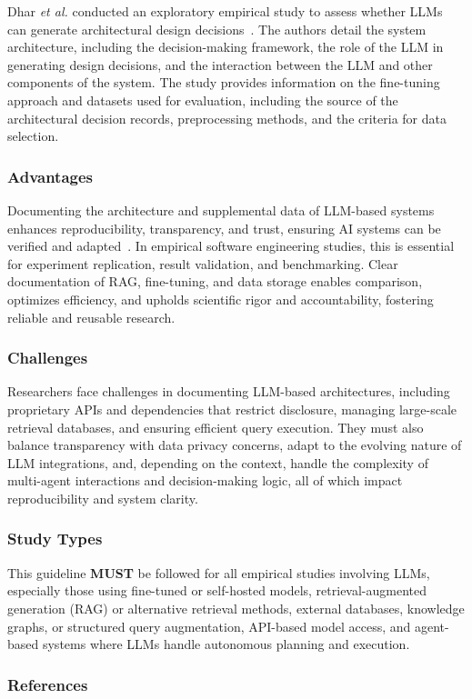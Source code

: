 \documentclass[11pt]{article}
\newcommand{\must}{\textbf{MUST}\xspace}
\begin{document}
Dhar \textit{et al.} conducted an exploratory empirical study to assess whether LLMs can generate architectural design decisions~\cite{DBLP:conf/icsa/DharVV24}. The authors detail the system architecture, including the decision-making framework, the role of the LLM in generating design decisions, and the interaction between the LLM and other components of the system. The study provides information on the fine-tuning approach and datasets used for evaluation, including the source of the architectural decision records, preprocessing methods, and the criteria for data selection. 

\subsubsection{Advantages}

Documenting the architecture and supplemental data of LLM-based systems enhances reproducibility, transparency, and trust, ensuring AI systems can be verified and adapted~\cite{DBLP:journals/software/LuZXXW24}. In empirical software engineering studies, this is essential for experiment replication, result validation, and benchmarking. Clear documentation of RAG, fine-tuning, and data storage enables comparison, optimizes efficiency, and upholds scientific rigor and accountability, fostering reliable and reusable research.

\subsubsection{Challenges}

Researchers face challenges in documenting LLM-based architectures, including proprietary APIs and dependencies that restrict disclosure, managing large-scale retrieval databases, and ensuring efficient query execution. They must also balance transparency with data privacy concerns, adapt to the evolving nature of LLM integrations, and, depending on the context, handle the complexity of multi-agent interactions and decision-making logic, all of which impact reproducibility and system clarity.

\subsubsection{Study Types}

This guideline \must be followed for all empirical studies involving LLMs, especially those using fine-tuned or self-hosted models, retrieval-augmented generation (RAG) or alternative retrieval methods, external databases, knowledge graphs, or structured query augmentation, API-based model access, and agent-based systems where LLMs handle autonomous planning and execution.

\subsubsection{References}



\end{document}
